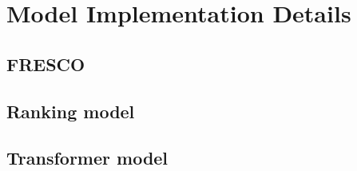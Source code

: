 \chapter{Model Implementation Details} \label{appendix:details}

\section{FRESCO}
\section{Ranking model}
\section{Transformer model}
\section{}